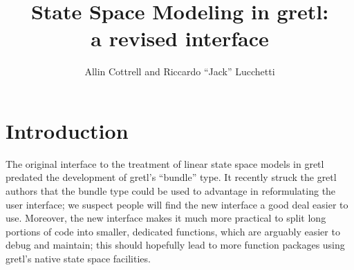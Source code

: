 \documentclass[a4paper]{article}
\begin{document}




\newcommand{\obsvec}{y}
\newcommand{\obsmat}{H}
\newcommand{\obsx}{x}
\newcommand{\obsxmat}{A}
\newcommand{\obsdist}{w}
\newcommand{\obsvar}{R}

\newcommand{\statevec}{\alpha}
\newcommand{\statevar}{P}
\newcommand{\statemat}{F}
\newcommand{\strdist}{v}
\newcommand{\strvar}{Q}
\newcommand{\gain}{K}
\newcommand{\statemu}{\mu}

\newcommand{\altstrvar}{B}
\newcommand{\altobsvar}{C}
\newcommand{\alldist}{\varepsilon}

\newcommand{\prederr}{e}
\newcommand{\predvar}{\Sigma}

\newcommand{\myvec}{\mbox{vec}}
\newcommand{\myvech}{\mbox{vech}}

\makeatletter
\def\pdots{\vbox{\baselineskip2.5\p@ 
  \lineskiplimit\z@ \kern2\p@\hbox{.}\hbox{.}\hbox{.}\hbox{.}}}
\makeatother

\setlength{\parindent}{0pt}
\setlength{\parskip}{1ex}

\title{State Space Modeling in gretl:\\a revised interface}
\author{Allin Cottrell and Riccardo ``Jack'' Lucchetti}
\maketitle

\section{Introduction}
\label{sec:amble}

The original interface to the treatment of linear state space models
in gretl predated the development of gretl's ``bundle'' type. It
recently struck the gretl authors that the bundle type could be used
to advantage in reformulating the user interface; we suspect people
will find the new interface a good deal easier to use. Moreover, the
new interface makes it much more practical to split long portions of
code into smaller, dedicated functions, which are arguably easier to
debug and maintain; this should hopefully lead to more function
packages using gretl's native state space facilities.
\end{document}
